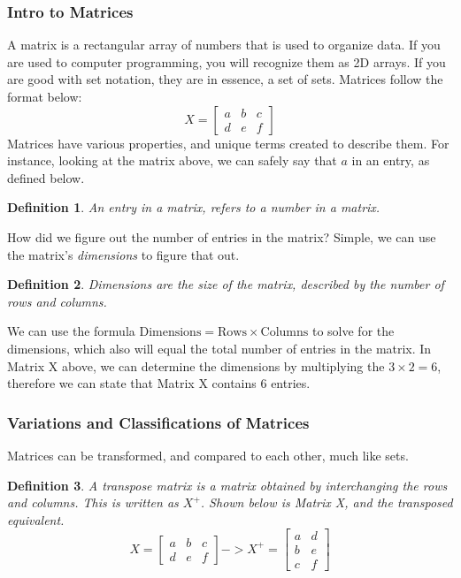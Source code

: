 \documentclass[final,1p,12pt]{elsarticle}
\newtheorem{definition}{Definition}
\begin{document}
        \subsubsection{Intro to Matrices}
        A matrix is a rectangular array of numbers that is used to organize data. If you are used to computer programming, you will recognize them as 2D arrays. If you are good with set notation, they are in essence, a set of sets. Matrices follow the format below:
        $$X =
        \begin{bmatrix}
            a & b & c \\
            d & e & f
        \end{bmatrix}
        $$
        Matrices have various properties, and unique terms created to describe them. For instance, looking at the matrix above, we can safely say that $a$ in an entry, as defined below.
        \begin{definition}
            An entry in a matrix, refers to a number in a matrix.
        \end{definition}
        How did we figure out the number of entries in the matrix? Simple, we can use the matrix's \emph{dimensions} to figure that out.
        \begin{definition}
            Dimensions are the size of the matrix, described by the number of rows and columns. 
        \end{definition}
        We can use the formula $\text{Dimensions}=\text{Rows}\times\text{Columns}$ to solve for the dimensions, which also will equal the total number of entries in the matrix. In Matrix X above, we can determine the dimensions by multiplying the $3\times 2=6$, therefore we can state that Matrix X contains 6 entries.
        
        \subsubsection{Variations and Classifications of Matrices}
        Matrices can be transformed, and compared to each other, much like sets.
        \begin{definition}
            A transpose matrix is a matrix obtained by interchanging the rows and columns. This is written as $X^{+}$. Shown below is Matrix X, and the transposed equivalent.
            $$X =
            \begin{bmatrix}
                a & b & c \\
                d & e & f
            \end{bmatrix}
            -> X^{+} =
            \begin{bmatrix}
                a & d \\
                b & e \\
                c & f
            \end{bmatrix}
            $$
            
        \end{definition}
        
\end{document}
